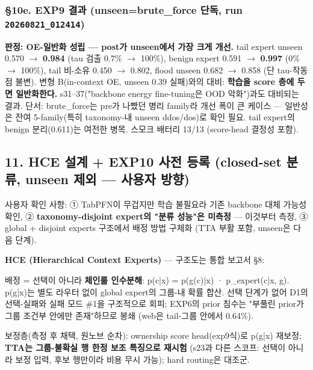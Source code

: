 \subsubsection{§10e. EXP9 결과 (unseen=\allowbreak{}brute\_\allowbreak{}force 단독, run \texttt{20260821\allowbreak{}\_\allowbreak{}\allowbreak{}012414})}
\textbf{판정: OE-일반화 성립 — post가 unseen에서 가장 크게 개선.} tail expert unseen 0.570 \ensuremath{\rightarrow} \textbf{0.984} (tau 검출 0.7\% \ensuremath{\rightarrow} 100\%), benign expert 0.591 \ensuremath{\rightarrow} \textbf{0.997} (0\% \ensuremath{\rightarrow} 100\%), tail 비-소유 0.450 \ensuremath{\rightarrow} 0.802, flood unseen 0.682 \ensuremath{\rightarrow} 0.858 (단 tau-작동점 불변). 변형 B(in-context OE, unseen 0.39 실패)와의 대비: \textbf{학습을 score 층에 두면 일반화한다.} s31–37("backbone energy fine-tuning은 OOD 악화")과도 대비되는 결과. 단서: brute\_\allowbreak{}force는 pre가 나빴던 병리 family라 개선 폭이 큰 케이스 — 일반성은 잔여 5-family(특히 taxonomy-내 unseen ddos/\allowbreak{}dos)로 확인 필요. tail expert의 benign 분리(0.611)는 여전한 병목. 스모크 배터리 13/\allowbreak{}13 (score-head 결정성 포함).

\subsection{11. HCE 설계 +\allowbreak{} EXP10 사전 등록 (closed-set 분류, unseen 제외 — 사용자 방향)}
사용자 확인 사항: ① TabPFN이 무겁지만 학습 불필요라 기존 backbone 대체 가능성 확인, ② \textbf{taxonomy-disjoint expert의 "분류 성능"은 미측정} — 이것부터 측정, ③ global +\allowbreak{} disjoint experts 구조에서 배정 방법 구체화 (TTA 부활 포함, unseen은 다음 단계).

\textbf{HCE (Hierarchical Context Experts)} — 구조도는 통합 보고서 §8:

\par\noindent \textbullet\enspace 배정 =\allowbreak{} 선택이 아니라 \textbf{체인룰 인수분해}: p(c|x) =\allowbreak{} p(g(c)|x) · p\_\allowbreak{}expert(c|x, g). p(g|x)는 별도 라우터 없이 global expert의 그룹-내 확률 합산. 선택 단계가 없어 D1의 선택-실패와 실패 모드 \#1을 구조적으로 회피; EXP6의 prior 침수는 "부풀린 prior가 그룹 조건부 안에만 존재"하므로 봉쇄 (web은 tail-그룹 안에서 0.64\%).


\par\noindent \textbullet\enspace 보정층(측정 후 채택, 원노브 순차): ownership score head(exp9식)로 p(g|x) 재보정; \textbf{TTA는 그룹-불확실 행 한정 보조 특징으로 재시험} (s23과 다른 스코프: 선택이 아니라 보정 입력, 후보 행만이라 비용 무시 가능); hard routing은 대조군.


